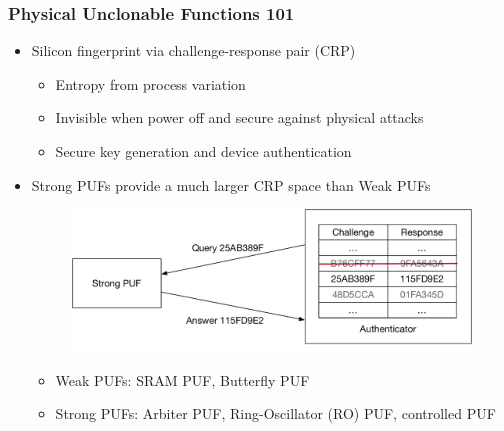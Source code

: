 \begin{frame}
\titlepage %
\end{frame}
\begin{frame}
\frametitle{Physical Unclonable Functions 101}
\begin{itemize}
\item	Silicon fingerprint via challenge-response pair (CRP)
	\begin{itemize}
	\item	Entropy from process variation
	\item	Invisible when power off and secure against physical attacks
	\item	Secure key generation and device authentication
	\end{itemize}
\item	Strong PUFs provide a much larger CRP space than Weak PUFs 
\begin{figure}
\centering
\includegraphics[width=.8\linewidth]{fig/StrongPUF.pdf}
\end{figure}
    \begin{itemize}
        \item Weak PUFs: SRAM PUF, Butterfly PUF
        \item Strong PUFs: Arbiter PUF, Ring-Oscillator (RO) PUF, controlled PUF
    \end{itemize}
\end{itemize}
\end{frame}

